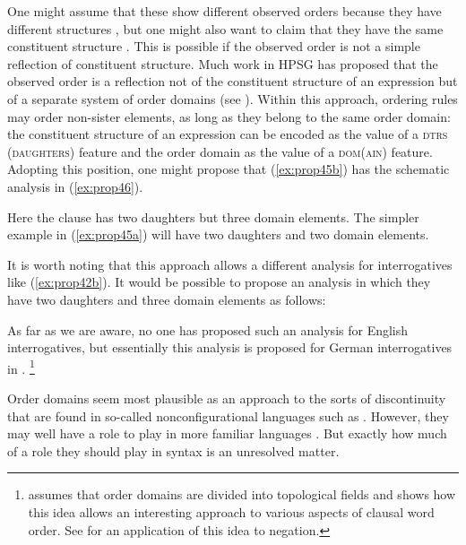 \documentclass[output=paper
	        ,collection
	        ,collectionchapter
 	        ,biblatex
                ,babelshorthands
                ,newtxmath
                ,draftmode
                ,colorlinks, citecolor=brown
]{langscibook}
\begin{document}
\noindent
One might assume that these show different observed orders because they have different structures
\citep{Kiss2005a}, but one might also want to claim that they have the same constituent structure
\citep{KP95a}. This is possible if the observed order is not a simple reflection of constituent
structure. Much work in HPSG has proposed that the observed order is a reflection not of the
constituent structure of an expression but of a separate system of order domains (see
\citealp{Reape94a,Babel,Kathol2000a}). Within this approach, ordering rules may order non-sister
elements, as long as they belong to the same order domain: the constituent structure of an
expression can be encoded as the value of a \textsc{dtrs (daughters)} feature and the order domain
as the value of a \textsc{dom(ain)} feature. Adopting this position, one might propose that
(\ref{ex:prop45b}) has the schematic analysis in (\ref{ex:prop46}). 

\ea\label{ex:prop46}
\z

\noindent
Here the clause has two daughters but three domain elements. The simpler example in (\ref{ex:prop45a}) will have two daughters and two domain elements.

It is worth noting that this approach allows a different analysis for interrogatives like (\ref{ex:prop42b}). It would be possible to propose an analysis in which they have two daughters and three domain elements as follows:

\ea\label{ex:prop47}
\z

\noindent
As far as we are aware, no one has proposed such an analysis for English interrogatives, but essentially this analysis is proposed for German interrogatives in \citet[81]{Kathol2000a}.%
%
\footnote{\citet{Kathol2000a} assumes that order domains are divided into topological fields and shows how this idea allows an interesting approach to various aspects of clausal word order. See \citet{Borsley:06} for an application of this idea to negation.}
%

Order domains seem most plausible as an approach to the sorts of discontinuity that are found in so-called nonconfigurational languages such as  \citep{DS99a}. However, they may well have a role to play in more familiar languages \citep{BGM99a,Chaves2014a-u}. But exactly how much of a role they should play in syntax is an unresolved matter.
\end{document}
